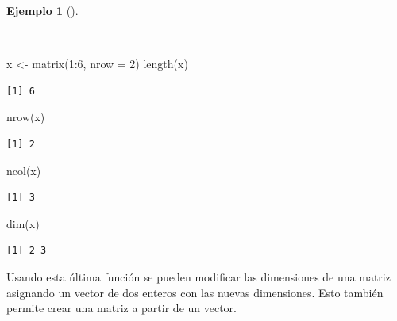 \documentclass[
  a4paper,
]{scrreport}
\newenvironment{Shaded}{\begin{snugshade}}{\end{snugshade}}
\newcommand{\AttributeTok}[1]{\textcolor[rgb]{0.40,0.45,0.13}{#1}}
\newcommand{\DecValTok}[1]{\textcolor[rgb]{0.68,0.00,0.00}{#1}}
\newcommand{\FunctionTok}[1]{\textcolor[rgb]{0.28,0.35,0.67}{#1}}
\newcommand{\NormalTok}[1]{\textcolor[rgb]{0.00,0.23,0.31}{#1}}
\newcommand{\OtherTok}[1]{\textcolor[rgb]{0.00,0.23,0.31}{#1}}
\newcommand{\SpecialCharTok}[1]{\textcolor[rgb]{0.37,0.37,0.37}{#1}}
\theoremstyle{definition}
\theoremstyle{definition}
\newtheorem{example}{Ejemplo}[chapter]
\theoremstyle{remark}
\begin{document}
\begin{example}[]\protect\hypertarget{exm-dimensiones-matriz}{}\label{exm-dimensiones-matriz}

~

\begin{Shaded}
\begin{Highlighting}[]
\NormalTok{x }\OtherTok{\textless{}{-}} \FunctionTok{matrix}\NormalTok{(}\DecValTok{1}\SpecialCharTok{:}\DecValTok{6}\NormalTok{, }\AttributeTok{nrow =} \DecValTok{2}\NormalTok{)}
\FunctionTok{length}\NormalTok{(x)}
\end{Highlighting}
\end{Shaded}

\begin{verbatim}
[1] 6
\end{verbatim}

\begin{Shaded}
\begin{Highlighting}[]
\FunctionTok{nrow}\NormalTok{(x)}
\end{Highlighting}
\end{Shaded}

\begin{verbatim}
[1] 2
\end{verbatim}

\begin{Shaded}
\begin{Highlighting}[]
\FunctionTok{ncol}\NormalTok{(x)}
\end{Highlighting}
\end{Shaded}

\begin{verbatim}
[1] 3
\end{verbatim}

\begin{Shaded}
\begin{Highlighting}[]
\FunctionTok{dim}\NormalTok{(x)}
\end{Highlighting}
\end{Shaded}

\begin{verbatim}
[1] 2 3
\end{verbatim}

\end{example}

Usando esta última función se pueden modificar las dimensiones de una
matriz asignando un vector de dos enteros con las nuevas dimensiones.
Esto también permite crear una matriz a partir de un vector.
\end{document}
